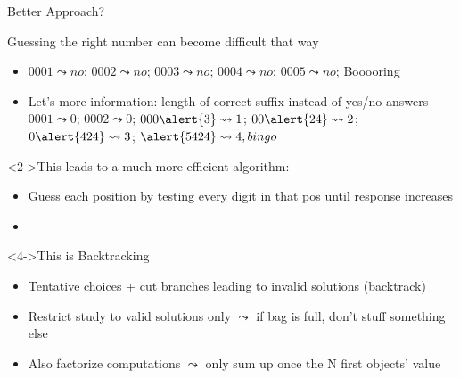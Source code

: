\begin{frame}{Better Approach?}
  \begin{block}{Guessing the right number can become difficult that way}
    \begin{itemize}
    \item 
      $0001 \leadsto no$; $0002 \leadsto no$; $0003 \leadsto no$; 
      $0004 \leadsto no$; $0005 \leadsto no$; Booooring
    \item Let's more information: length of correct suffix instead of yes/no answers\\
      $0001 \leadsto 0$; $0002 \leadsto 0$; $000\alert{3} \leadsto 1$;
      $00\alert{24} \leadsto 2$; $0\alert{424} \leadsto 3$; $\alert{5424} \leadsto 4, bingo$
    \end{itemize}   
  \end{block}\vspace{-.6\baselineskip}
  \begin{block}<2->{This leads to a much more efficient algorithm:}
    \begin{itemize}
    \item Guess each position by testing every digit in that pos until response
      increases
    \item {}
    \end{itemize}
  \end{block}\vspace{-.6\baselineskip}

  \begin{block}<4->{This is Backtracking}
    \begin{itemize}\vspace{-.4\baselineskip}
    \item Tentative choices + cut branches leading to invalid solutions (backtrack)
    \item Restrict study to valid solutions only
      {\small $\leadsto$ if bag is full, don't stuff something else}\\
    \item Also factorize computations
      {\small $\leadsto$ only sum up once the N first objects' value}
    \end{itemize}    
  \end{block}
\end{frame}
